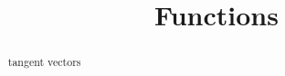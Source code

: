 \documentclass{ximera}
\title{Functions}
\begin{document}
\begin{abstract}
tangent vectors
\end{abstract}
\maketitle
\end{document}
